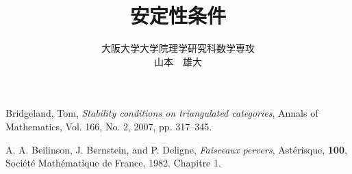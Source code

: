 \documentclass[eqno]{ltjsarticle}
\begin{document}
\title{安定性条件}
\date{}
\author{大阪大学大学院理学研究科数学専攻\\山本　雄大}
\maketitle
\tableofcontents




\begin{thebibliography}{99}
	Bridgeland, Tom,
		\textit{Stability conditions on triangulated categories},
	Annals of Mathematics, Vol. 166, No. 2, 2007, pp. 317–345.

	A. A. Beilinson, J. Bernstein, and P. Deligne,
	\textit{Faisceaux pervers},
	Astérisque, \textbf{100}, Société Mathématique de France, 1982. Chapitre 1.
\end{thebibliography}
\end{document}
